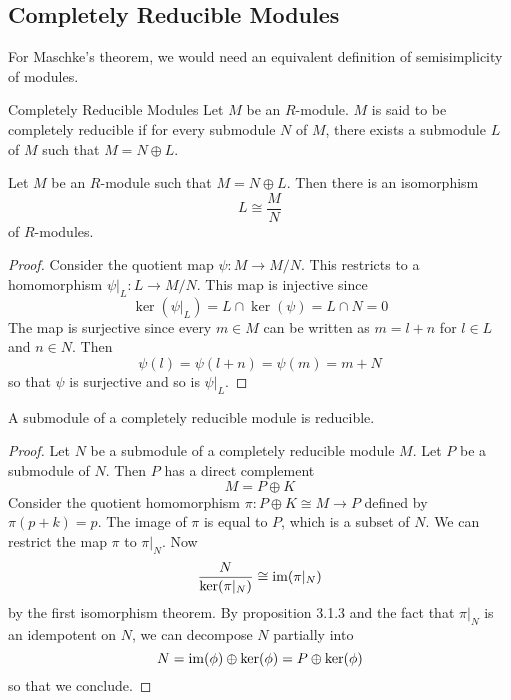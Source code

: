 \documentclass[a4paper]{article}
\begin{document}
\subsection{Completely Reducible Modules}
For Maschke's theorem, we would need an equivalent definition of semisimplicity of modules. 

\begin{defn}{Completely Reducible Modules}{} Let $M$ be an $R$-module. $M$ is said to be completely reducible if for every submodule $N$ of $M$, there exists a submodule $L$ of $M$ such that $M=N\oplus L$. 
\end{defn}

\begin{prp}{}{} Let $M$ be an $R$-module such that $M=N\oplus L$. Then there is an isomorphism $$L\cong\frac{M}{N}$$ of $R$-modules. \tcbline
\begin{proof}
Consider the quotient map $\psi:M\to M/N$. This restricts to a homomorphism $\psi|_L:L\to M/N$. This map is injective since $$\ker(\psi|_L)=L\cap\ker(\psi)=L\cap N=0$$ The map is surjective since every $m\in M$ can be written as $m=l+n$ for $l\in L$ and $n\in N$. Then $$\psi(l)=\psi(l+n)=\psi(m)=m+N$$ so that $\psi$ is surjective and so is $\psi|_L$. 
\end{proof}
\end{prp}

\begin{lmm}{}{} A submodule of a completely reducible module is reducible. \tcbline
\begin{proof}
Let $N$ be a submodule of a completely reducible module $M$. Let $P$ be a submodule of $N$. Then $P$ has a direct complement $$M=P\oplus K$$ Consider the quotient homomorphism $\pi:P\oplus K\cong M\to P$ defined by $\pi(p+k)=p$. The image of $\pi$ is equal to $P$, which is a subset of $N$. We can restrict the map $\pi$ to $\pi|_N$. Now $$\frac{N}{\ker(\pi|_N)}\cong\operatorname{im}(\pi|_N)$$ by the first isomorphism theorem. By proposition 3.1.3 and the fact that $\pi|_N$ is an idempotent on $N$, we can decompose $N$ partially into $$N=\operatorname{im}(\phi)\oplus\ker(\phi)=P\oplus\ker(\phi)$$ so that we conclude. 
\end{proof}
\end{lmm}
\end{document}
